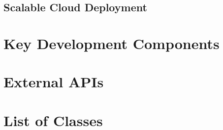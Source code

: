 	\subsection{Scalable Cloud Deployment}

\section{Key Development Components}

\section{External APIs}

\section{List of Classes}
